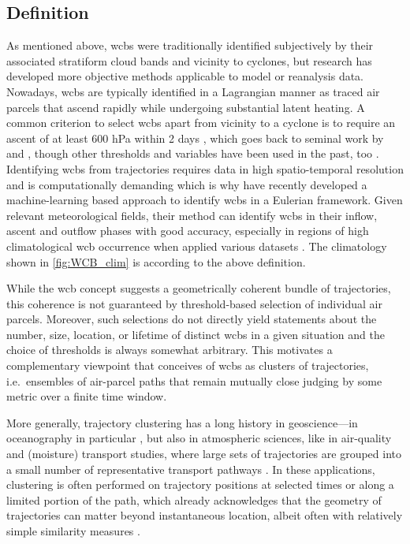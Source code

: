 \subsection{Definition} \label{sec:intro_wcb_def}
As mentioned above, \glspl{wcb} were traditionally identified subjectively
by their associated stratiform cloud bands and vicinity to cyclones, but
research has developed more objective methods applicable to model or
reanalysis data. Nowadays, \glspl{wcb} are typically identified in a Lagrangian
manner as traced air parcels that ascend rapidly while undergoing substantial
latent heating. A common criterion to select \glspl{wcb} apart from vicinity to
a cyclone is to require an ascent of at least 600 hPa within 2 days
\parencite[e.g.,~][]{madonnaWarmConveyorBelts2014a,
    sprengerGlobalClimatologiesEulerian2017}, which goes back to seminal
work by \textcite{wernliLagrangianbasedAnalysisExtratropical1997} and
\textcite{wernliLagrangianbasedAnalysisExtratropical1997a}, though other
thresholds and variables have been used in the past, too
\parencite{stohl1yearLagrangianClimatology2001,
    eckhardt15yearClimatologyWarm2004}. Identifying \glspl{wcb} from
trajectories
requires data in high spatio-temporal resolution and is computationally
demanding which is
why \textcite{quintingEuLerianIdentificationAscending2022a} have recently
developed a machine-learning based approach to identify \glspl{wcb} in a
Eulerian framework. Given relevant meteorological fields, their method can
identify \glspl{wcb} in their inflow, ascent and outflow phases with good
accuracy, especially in regions of high climatological \gls{wcb} occurrence
when applied various datasets
\parencite{quintingEuLerianIdentificationAscending2022}. The climatology shown
in \cref{fig:WCB_clim} is according to the above definition.

While the \gls{wcb} concept suggests a geometrically coherent bundle of
trajectories, this coherence is not guaranteed by threshold-based selection of
individual air parcels. Moreover, such selections do not directly yield
statements about the number, size, location, or lifetime of distinct
\glspl{wcb} in a given situation and the choice of thresholds is always
somewhat arbitrary. This motivates a complementary viewpoint that conceives of
\glspl{wcb} as clusters of trajectories, i.e.~ensembles of air-parcel paths
that remain mutually close judging by some metric over a finite time window.

More generally, trajectory clustering has a long history in geoscience---in
oceanography in particular \parencite{vansebilleLagrangianOceanAnalysis2018},
but also in atmospheric sciences, like in air-quality and (moisture) transport
studies, where large sets of trajectories are grouped into a small number of
representative transport pathways
\parencite{stohlComputationAccuracyApplications1998,
    capeUseTrajectoryCluster2000}. In these applications, clustering is often
performed on trajectory positions at selected times or along a limited portion
of the path, which already acknowledges that the geometry of trajectories can
matter beyond instantaneous location, albeit often with relatively simple
similarity measures \parencite{stohlComputationAccuracyApplications1998}.

